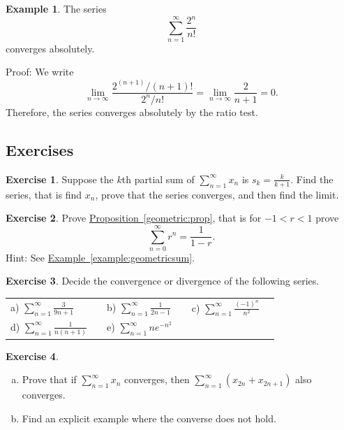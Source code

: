 \documentclass[12pt]{book}
\theoremstyle{plain}
\theoremstyle{remark}
\theoremstyle{definition}
\theoremstyle{exercise}
\newtheorem{exercise}{Exercise}[section]
\theoremstyle{example}
\newtheorem{example}[thm]{Example}
\newcommand{\exampleref}[1]{\hyperref[#1]{Example~\ref*{#1}}}
\newcommand{\propref}[1]{\hyperref[#1]{Proposition~\ref*{#1}}}
\begin{document}
\begin{example}
The series
\begin{equation*}
\sum_{n=1}^\infty \frac{2^n}{n!}
\end{equation*}
converges absolutely.

Proof:  We write
\begin{equation*}
\lim_{n\to\infty} \frac{2^{(n+1)}/(n+1)!}{2^n / n!} =
\lim_{n\to\infty} \frac{2}{n+1} = 0 .
\end{equation*}
Therefore, the series converges absolutely by the ratio test.
\end{example}

\subsection{Exercises}

\begin{exercise}
Suppose the $k$th partial sum of $\sum_{n=1}^\infty x_n$ is $s_k = \frac{k}{k+1}$.
Find the series, that is find $x_n$, prove that the series converges, and
then find the limit.
\end{exercise}

\begin{exercise} \label{geometric:exr}
Prove \propref{geometric:prop}, that is for $-1 < r < 1$ prove
\begin{equation*}
\sum_{n=0}^\infty r^n = \frac{1}{1-r} .
\end{equation*}
Hint:  See \exampleref{example:geometricsum}.
\end{exercise}

\begin{exercise}
Decide the convergence or divergence of the following series.

\medskip

\noindent
\begin{tabular}{llllll}
a)
$\displaystyle \sum_{n=1}^\infty \frac{3}{9n+1}$
& &
b)
$\displaystyle \sum_{n=1}^\infty \frac{1}{2n-1}$
& &
c)
$\displaystyle \sum_{n=1}^\infty \frac{{(-1)}^n}{n^2}$
\\
d)
$\displaystyle \sum_{n=1}^\infty \frac{1}{n(n+1)}$
& &
e)
$\displaystyle \sum_{n=1}^\infty n e^{-n^2}$
\end{tabular}
\end{exercise}

\begin{samepage}
\begin{exercise}
{\ }
\begin{enumerate}[a)]
\item Prove that if
$\displaystyle
\sum_{n=1}^\infty x_n
$
converges, then
$\displaystyle
\sum_{n=1}^\infty ( x_{2n} + x_{2n+1} )
$
also converges.
\item
Find an explicit example where the converse does not hold.
\end{enumerate}
\end{exercise}
\end{samepage}
\end{document}
